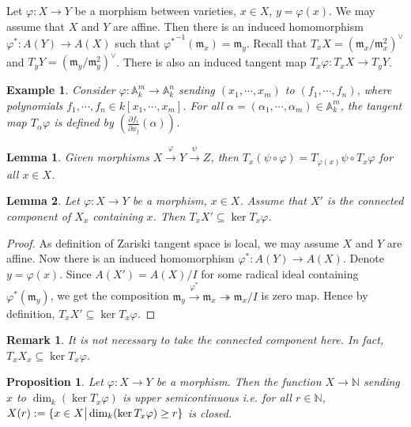 \documentclass{ctexart}
\newtheorem{remark}{Remark}[section]
\newtheorem{proposition}{Proposition}[section]
\newtheorem{lemma}{Lemma}[section]
\newtheorem{example}{Example}[section]
\begin{document}
Let $\varphi: X \rightarrow Y$ be a morphism between varieties, $x\in X$, $y = \varphi(x)$.
We may assume that $X$ and $Y$ are affine.
Then there is an induced homomorphism $\varphi^{\ast}: A(Y) \rightarrow A(X)$ such that ${\varphi^{\ast}}^{-1}(\mathfrak{m}_{x}) = \mathfrak{m}_{y}$.
Recall that $T_{x}X = (\mathfrak{m}_{x}/\mathfrak{m}_{x}^{2})^{\vee}$ and $T_{y}Y = (\mathfrak{m}_{y}/\mathfrak{m}_{y}^{2})^{\vee}$.
There is also an induced tangent map $T_{x}\varphi: T_{x}X \rightarrow T_{y}Y$.
\begin{example}
    Consider $\varphi: \mathbb{A}_{k}^{m} \rightarrow \mathbb{A}_{k}^{n}$ sending $(x_{1}, \cdots, x_{m})$ to $(f_{1}, \cdots, f_{n})$,
    where polynomials $f_{1}, \cdots, f_{n}\in k[x_{1}, \cdots, x_{m}]$.
    For all $\alpha = (\alpha_{1}, \cdots, \alpha_{m})\in \mathbb{A}_{k}^{m}$,
    the tangent map $T_{\alpha}\varphi$ is defined by $(\frac{\partial f_{i}}{\partial x_{j}}(\alpha))$.
\end{example}
\begin{lemma}
    Given morphisms $X \overset{\varphi}{\rightarrow} Y \overset{\psi}{\rightarrow} Z$,
    then $T_{x}(\psi \circ \varphi) = T_{\varphi(x)}\psi \circ T_{x}\varphi$ for all $x\in X$.
    \label{Lemma 5.8}
\end{lemma}
\begin{lemma}
    Let $\varphi: X \rightarrow Y$ be a morphism, $x\in X$.
    Assume that $X'$ is the connected component of $X_{x}$ containing $x$.
    Then $T_{x}X' \subseteq \ker T_{x}\varphi$.
    \label{Lemma 5.9}
\end{lemma}
\begin{proof}
    As definition of Zariski tangent space is local, we may assume $X$ and $Y$ are affine.
    Now there is an induced homomorphism $\varphi^{\ast}: A(Y) \rightarrow A(X)$.
    Denote $y = \varphi(x)$.
    Since $A(X') = A(X)/I$ for some radical ideal containing $\varphi^{\ast}(\mathfrak{m}_{y})$,
    we get the composition $\mathfrak{m}_{y} \overset{\varphi^{\ast}}{\rightarrow} \mathfrak{m}_{x} \twoheadrightarrow \mathfrak{m}_{x}/I$ is zero map.
    Hence by definition, $T_{x}X' \subseteq \ker T_{x}\varphi$.
\end{proof}
\begin{remark}
    It is not necessary to take the connected component here.
    In fact, $T_{x}X_{x} \subseteq \ker T_{x}\varphi$.
\end{remark}
\begin{proposition}
    Let $\varphi: X \rightarrow Y$ be a morphism.
    Then the function $X \rightarrow \mathbb{N}$ sending $x$ to $\dim_{k} (\ker T_{x}\varphi)$ is upper semicontinuous i.e. for all $r\in \mathbb{N}$,
    $X(r) := \{x\in X \big{|} \dim_{k} (\ker T_{x}\varphi) \ge r\}$ is closed.
    \label{Proposition 5.4}
\end{proposition}
\end{document}
